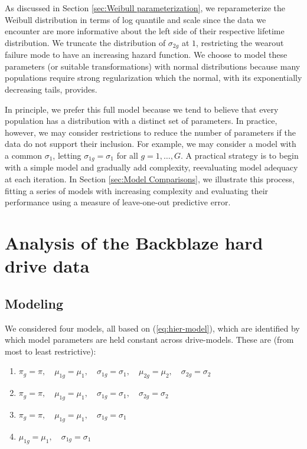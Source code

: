 \documentclass[12pt]{article}
\begin{document}
As discussed in Section \ref{sec:Weibull parameterization}, we reparameterize the Weibull distribution in terms of log quantile and scale since the data we encounter are more informative about the left side of their respective lifetime distribution. We truncate the distribution of $\sigma_{2g}$ at $1$, restricting the wearout failure mode to have an increasing hazard function. We choose to model these parameters (or suitable transformations) with normal distributions because many populations require strong regularization which the normal, with its exponentially decreasing tails, provides. 

In principle, we prefer this full model because we tend to believe that every population has a distribution with a distinct set of parameters. In practice, however, we may consider restrictions to reduce the number of parameters if the data do not support their inclusion. For example, we may consider a model with a common $\sigma_{1}$, letting $\sigma_{1g}=\sigma_1$ for all $g=1,\ldots,G$. A practical strategy is to begin with a simple model and gradually add complexity, reevaluating model adequacy at each iteration. In Section \ref{sec:Model Comparisons}, we illustrate this process, fitting a series of models with increasing complexity and evaluating their performance using a measure of leave-one-out predictive error.


\section{Analysis of the Backblaze hard drive data}
\label{sec:Data analysis}
\subsection{Modeling}
We considered four models, all based on (\ref{eq:hier-model}), which are identified by which model parameters are held constant across drive-models. These are (from most to least restrictive):

\begin{enumerate}
\item $\pi_{g} = \pi,\quad \mu_{1g} = \mu_1,\quad \sigma_{1g}=\sigma_1,\quad \mu_{2g} = \mu_2,\quad \sigma_{2g} = \sigma_2$
\item $\pi_{g} = \pi,\quad \mu_{1g} = \mu_1,\quad \sigma_{1g}=\sigma_1,\quad \sigma_{2g} = \sigma_2$
\item $\pi_{g} = \pi,\quad \mu_{1g} = \mu_1,\quad \sigma_{1g}=\sigma_1$
\item $\mu_{1g} = \mu_1,\quad \sigma_{1g}=\sigma_1$
\end{enumerate}
\end{document}
